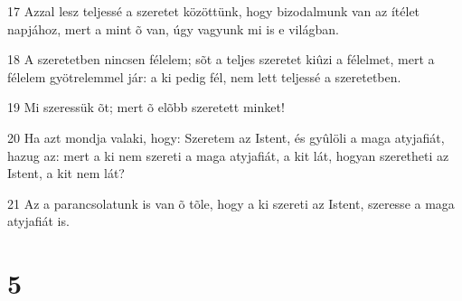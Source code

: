 \par 17 Azzal lesz teljessé a szeretet közöttünk, hogy bizodalmunk van az ítélet napjához, mert a mint õ  van, úgy vagyunk mi is e világban.
\par 18 A szeretetben nincsen félelem; sõt a teljes szeretet kiûzi a félelmet, mert a félelem gyötrelemmel jár: a ki pedig fél, nem lett teljessé a szeretetben.
\par 19 Mi szeressük õt; mert õ elõbb szeretett minket!
\par 20 Ha azt mondja valaki, hogy: Szeretem az Istent, és gyûlöli a maga atyjafiát, hazug az: mert a ki nem szereti a maga atyjafiát, a kit lát, hogyan szeretheti  az Istent, a kit nem lát?
\par 21 Az a parancsolatunk is van õ tõle, hogy a ki szereti az Istent, szeresse a maga atyjafiát is.

\chapter{5}

